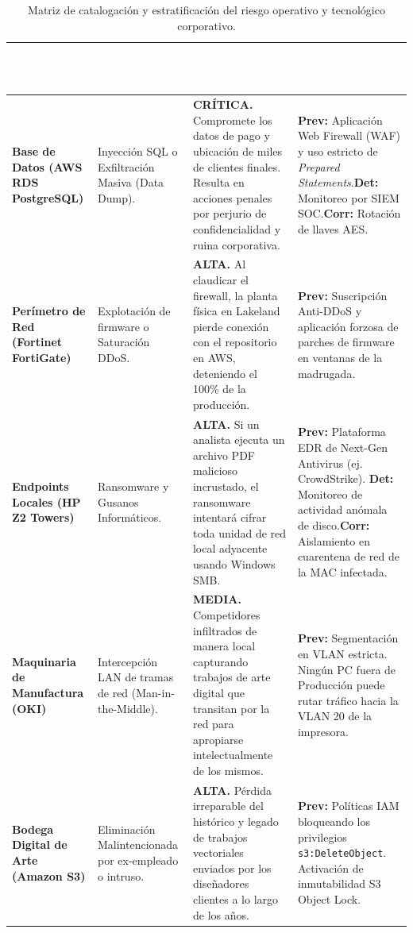 \documentclass[11pt,a4paper]{article}
\begin{document}
\vspace{0.5cm}
\begin{table}[H]
\centering
\renewcommand{\arraystretch}{1.4}
\begin{tabularx}{\textwidth}{|p{3cm}|p{3.5cm}|X|p{3.5cm}|}
\hline
\rowcolor{primary}
\textcolor{white}{\textbf{Elemento Físico / Lógico}} & \textcolor{white}{\textbf{Amenaza Principal}} & \textcolor{white}{\textbf{Análisis de Severidad e Impacto}} & \textcolor{white}{\textbf{Medidas Defensivas Implementadas}} \\ \hline
\textbf{Base de Datos (AWS RDS PostgreSQL)} & Inyección SQL o Exfiltración Masiva (Data Dump). & \textbf{CRÍTICA.} Compromete los datos de pago y ubicación de miles de clientes finales. Resulta en acciones penales por perjurio de confidencialidad y ruina corporativa. & \textbf{Prev:} Aplicación Web Firewall (WAF) y uso estricto de \textit{Prepared Statements}.\newline \textbf{Det:} Monitoreo por SIEM SOC.\newline \textbf{Corr:} Rotación de llaves AES. \\ \hline
\textbf{Perímetro de Red (Fortinet FortiGate)} & Explotación de firmware o Saturación DDoS. & \textbf{ALTA.} Al claudicar el firewall, la planta física en Lakeland pierde conexión con el repositorio en AWS, deteniendo el 100\% de la producción. & \textbf{Prev:} Suscripción Anti-DDoS y aplicación forzosa de parches de firmware en ventanas de la madrugada. \\ \hline
\textbf{Endpoints Locales (HP Z2 Towers)} & Ransomware y Gusanos Informáticos. & \textbf{ALTA.} Si un analista ejecuta un archivo PDF malicioso incrustado, el ransomware intentará cifrar toda unidad de red local adyacente usando Windows SMB. & \textbf{Prev:} Plataforma EDR de Next-Gen Antivirus (ej. CrowdStrike). \newline \textbf{Det:} Monitoreo de actividad anómala de disco.\newline \textbf{Corr:} Aislamiento en cuarentena de red de la MAC infectada. \\ \hline
\textbf{Maquinaria de Manufactura (OKI)} & Intercepción LAN de tramas de red (Man-in-the-Middle). & \textbf{MEDIA.} Competidores infiltrados de manera local capturando trabajos de arte digital que transitan por la red para apropiarse intelectualmente de los mismos. & \textbf{Prev:} Segmentación en VLAN estricta. Ningún PC fuera de Producción puede rutar tráfico hacia la VLAN 20 de la impresora. \\ \hline
\textbf{Bodega Digital de Arte (Amazon S3)} & Eliminación Malintencionada por ex-empleado o intruso. & \textbf{ALTA.} Pérdida irreparable del histórico y legado de trabajos vectoriales enviados por los diseñadores clientes a lo largo de los años. & \textbf{Prev:} Políticas IAM bloqueando los privilegios \texttt{s3:DeleteObject}. Activación de inmutabilidad S3 Object Lock. \\ \hline
\end{tabularx}
\caption{Matriz de catalogación y estratificación del riesgo operativo y tecnológico corporativo.}
\end{table}
\end{document}
